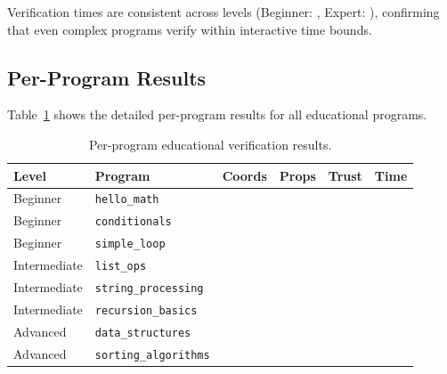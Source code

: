 \documentclass[11pt]{article}
\begin{document}
Verification times are consistent across levels (Beginner:
\ppLXVIBeginnerMeanTime{}, Expert: \ppLXVIExpertMeanTime{}), confirming
that even complex programs verify within interactive time bounds.

\subsection{Per-Program Results}

Table~\ref{tab:edu-programs} shows the detailed per-program results for all
\ppLXVIprogramCount{} educational programs.

\begin{table}[t]
\centering
\caption{Per-program educational verification results.}
\label{tab:edu-programs}
\begin{tabular}{llrrrr}
\toprule
\textbf{Level} & \textbf{Program} & \textbf{Coords} & \textbf{Props} &
  \textbf{Trust} & \textbf{Time} \\
\midrule
Beginner & \texttt{hello\_math} & \ppLXVIeduhellomathCoords{} &
  \ppLXVIeduhellomathProps{} & \ppLXVIeduhellomathTrust{} &
  \ppLXVIeduhellomathTime{} \\
Beginner & \texttt{conditionals} & \ppLXVIeduconditionalsCoords{} &
  \ppLXVIeduconditionalsProps{} & \ppLXVIeduconditionalsTrust{} &
  \ppLXVIeduconditionalsTime{} \\
Beginner & \texttt{simple\_loop} & \ppLXVIedusimpleloopCoords{} &
  \ppLXVIedusimpleloopProps{} & \ppLXVIedusimpleloopTrust{} &
  \ppLXVIedusimpleloopTime{} \\
\midrule
Intermediate & \texttt{list\_ops} & \ppLXVIedulistopsCoords{} &
  \ppLXVIedulistopsProps{} & \ppLXVIedulistopsTrust{} &
  \ppLXVIedulistopsTime{} \\
Intermediate & \texttt{string\_processing} &
  \ppLXVIedustringprocessingCoords{} &
  \ppLXVIedustringprocessingProps{} &
  \ppLXVIedustringprocessingTrust{} &
  \ppLXVIedustringprocessingTime{} \\
Intermediate & \texttt{recursion\_basics} &
  \ppLXVIedurecursionbasicsCoords{} &
  \ppLXVIedurecursionbasicsProps{} &
  \ppLXVIedurecursionbasicsTrust{} &
  \ppLXVIedurecursionbasicsTime{} \\
\midrule
Advanced & \texttt{data\_structures} &
  \ppLXVIedudatastructuresCoords{} &
  \ppLXVIedudatastructuresProps{} &
  \ppLXVIedudatastructuresTrust{} &
  \ppLXVIedudatastructuresTime{} \\
Advanced & \texttt{sorting\_algorithms} &
  \ppLXVIedusortingalgorithmsCoords{} &
  \ppLXVIedusortingalgorithmsProps{} &

\end{tabular}
\end{table}
\end{document}
